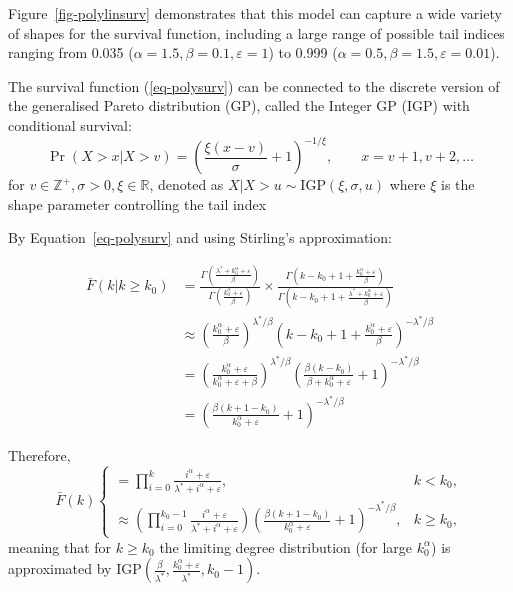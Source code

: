 \documentclass[
  sn-basic,
]{sn-jnl}
\theoremstyle{plain}
\theoremstyle{plain}
\theoremstyle{remark}
\begin{document}
Figure~\ref{fig-polylinsurv} demonstrates that this model can capture a
wide variety of shapes for the survival function, including a large
range of possible tail indices ranging from 0.035
(\(\alpha=1.5, \beta=0.1, \varepsilon=1\)) to 0.999
(\(\alpha=0.5, \beta=1.5, \varepsilon=0.01\)).

The survival function (\ref{eq-polysurv}) can be connected to the
discrete version of the generalised Pareto distribution (GP), called the
Integer GP (IGP) \citep{Rohrbeck_2018} with conditional survival: \[
\Pr(X> x|X> v) = \left(\frac{\xi(x-v)}{\sigma} + 1\right)^{-1/\xi},\qquad x=v+1,v+2,\ldots
\] for \(v\in\mathbb Z^+, \sigma>0,\xi\in \mathbb R\), denoted as
\(X|X>u \sim  \mathrm {IGP}(\xi, \sigma, u)\) where \(\xi\) is the shape
parameter controlling the tail index

By Equation~\ref{eq-polysurv} and using Stirling's approximation:

\begin{align*}
\bar F(k|k\ge k_0) &= \frac{\Gamma\left(\frac{\lambda^* + k_0^\alpha + \varepsilon}{\beta}\right)}{\Gamma\left(\frac{k_0^\alpha + \varepsilon}{\beta}\right)}\times\frac{\Gamma\left(k-k_0  +1 + \frac{k_0^\alpha + \varepsilon}{\beta}\right)}{\Gamma\left(k-k_0  +1 + \frac{\lambda^*+ k_0^\alpha + \varepsilon}{\beta}\right)}\\
&\approx\left(\frac{k_0^\alpha+\varepsilon}{\beta}\right)^{\lambda^*/\beta}\left(k-k_0+1+\frac{k_0^\alpha + \varepsilon}{\beta}\right)^{-\lambda^*/\beta}\\
&=\left(\frac{k_0^\alpha+\varepsilon}{k_0^\alpha+\varepsilon + \beta}\right)^{\lambda^*/\beta}\left(\frac{\beta(k-k_0)}{\beta + k_0^\alpha+\varepsilon} + 1\right)^{-\lambda^*/\beta}\\
&=\left(\frac{\beta(k+1-k_0)}{k_0^{\alpha}+\varepsilon} + 1\right)^{-\lambda^{*}/\beta}
\end{align*}

Therefore, \[
\bar F(k) 
\begin{cases}
=\prod_{i=0}^{k}\frac{i^\alpha + \varepsilon}{\lambda^*+i^\alpha + \varepsilon},&k<k_0,\\
\approx \left(\prod_{i=0}^{k_0-1}\frac{i^\alpha + \varepsilon}{\lambda^*+i^\alpha + \varepsilon}\right) \left(\frac{\beta(k+1-k_0)}{k_0^{\alpha}+\varepsilon} + 1\right)^{-\lambda^*/\beta},&k\ge k_0,
\end{cases}
\] meaning that for \(k\ge k_0\) the limiting degree distribution (for
large \(k_0^\alpha\)) is approximated by
\(\text{IGP}\left(\frac{\beta}{\lambda^*}, \frac{k_0^\alpha + \varepsilon}{\lambda^*},k_0-1\right)\).
\end{document}
